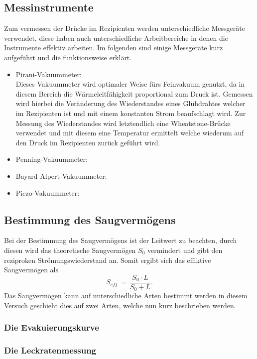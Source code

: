 \subsection{Messinstrumente}
Zum vermessen der Drücke im Rezipienten werden unterschiedliche Messgeräte verwendet, diese haben auch unterschiedliche Arbeitbereiche 
in denen die Instrumente effektiv arbeiten. Im folgenden sind einige Messgeräte kurz aufgeführt und die funktionsweise erklärt.
\begin{itemize}
 \item Pirani-Vakuummeter:\\
 Dieses Vakuummeter wird optimaler Weise fürs Feinvakuum genutzt, da in diesem Bereich die Wärmeleitfähigkeit proportional zum Druck ist.
Gemessen wird hierbei die Veränderung des Wiederstandes eines Glühdrahtes welcher im Rezipienten ist und mit einem konstanten Strom beaufschlagt 
wird. Zur Messung des Wiederstandes wird letztendlich eine Wheatstone-Brücke verwendet und mit diesem eine Temperatur ermittelt welche wiederum 
auf den Druck im Rezipienten zurück geführt wird.
 \item Penning-Vakuummeter:\\
 
 \item Bayard-Alpert-Vakuummeter:\\
 
 \item Piezo-Vakuummeter:\\
 
\end{itemize}

\subsection{Bestimmung des Saugvermögens}
Bei der Bestimmung des Saugvermögens ist der Leitwert zu beachten, durch diesen wird das theoretische Saugvermögen $S_0$
vermindert und gibt den reziproken Strömungswiederstand an. Somit ergibt sich das effiktive Saugvermögen als 
\begin {equation}
 S_{eff}\,=\, \frac{S_0\cdot L}{S_0+L}.
\label{eqn:effsaug}
\end{equation}
Das Saugvermögen kann auf unterschiedliche Arten bestimmt werden in diesem Versuch geschieht dies auf zwei Arten, welche nun 
kurz beschrieben werden.
\subsubsection{Die Evakuierungskurve}

\subsubsection{Die Leckratenmessung}

